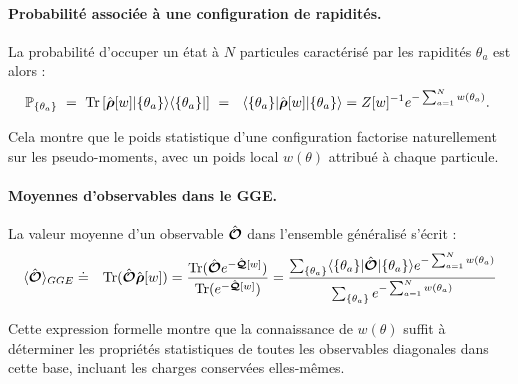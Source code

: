 \paragraph{Probabilité associée à une configuration de rapidités.}

La probabilité d’occuper un état à $N$ particules caractérisé par les rapidités ${\theta_a}$ est alors :
\begin{eqnarray}
	\mathbb{P}_{\{ \theta_a \}} ~=~ \mathrm{Tr} \left [\operator{\rho}[w] \vert \{ \theta_a \} \rangle \langle \{ \theta_a \} \vert  \right ] ~= ~ \langle \{ \theta_a \}\vert \operator{\rho}[w] \vert  \{ \theta_a \} \rangle = Z[w]^{-1}e^{-\sum_{a = 1}^N w(\theta_a)}. 		
\end{eqnarray}

Cela montre que le poids statistique d’une configuration factorise naturellement sur les pseudo-moments, avec un poids local $w(\theta)$ attribué à chaque particule.



\paragraph{Moyennes d'observables dans le GGE.}
La valeur moyenne d’un observable $\hat{\bm{\mathcal{O}}}$ dans l’ensemble généralisé s’écrit :
\begin{eqnarray}
	\langle \hat{\bm{\mathcal{O}}} \rangle_{GGE} & \doteq & \displaystyle  \text{Tr} (\hat{\bm{\mathcal{O}}}\hat{\bm{\rho}}[w]) = \frac{\text{Tr} (\hat{\bm{\mathcal{O}}}e^{-\hat{\bm{\mathcal{Q}}}[w]})}{\text{Tr} (e^{-\hat{\bm{\mathcal{Q}}}[w]})}	 = \frac{\sum_{\{\theta_a \}} \langle  \{ \theta_a\}  \vert   \hat{\bm{\mathcal{O}}} \vert \{ \theta_a\} \rangle e^{- \sum_{a = 1}^N w(\theta_a) }  }{\sum_{\{\theta_a  \}} e^{- \sum_{a = 1}^N  w(\theta_a) } }
\end{eqnarray}

Cette expression formelle montre que la connaissance de $w(\theta)$ suffit à déterminer les propriétés statistiques de toutes les observables diagonales dans cette base, incluant les charges conservées elles-mêmes.
	
